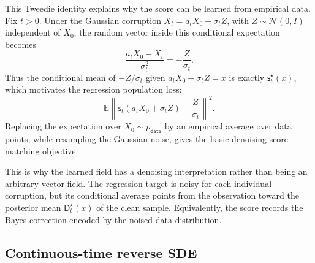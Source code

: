 \documentclass{amsart}
\numberwithin{equation}{section}
\theoremstyle{plain}
\theoremstyle{definition}
\theoremstyle{remark}
\newcommand{\E}{\mathbb{E}}
\newcommand{\Id}{I}
\newcommand{\norm}[1]{\left\lVert #1 \right\rVert}
\newcommand{\pdata}{p_{\mathsf{data}}}
\newcommand{\sstar}{\mathsf{s}^{\star}}
\newcommand{\score}{\mathsf{s}}
\newcommand{\dstar}{\mathsf{D}^{\star}}
\newcommand{\normal}[2]{\mathcal{N}\!\left(#1,#2\right)}
\begin{document}
This Tweedie identity explains why the score can be learned from empirical data.
Fix $t>0$.
Under the Gaussian corruption $X_t=a_tX_0+\sigma_t Z$, with
$Z\sim\normal{0}{\Id}$ independent of $X_0$, the random vector inside this
conditional expectation becomes
\[
    \frac{a_tX_0-X_t}{\sigma_t^2}
    =
    -\frac{Z}{\sigma_t}.
\]
Thus the conditional mean of $-Z/\sigma_t$ given $a_tX_0+\sigma_t Z=x$ is
exactly $\sstar_t(x)$, which motivates the regression population loss:
\[
    \E\norm{
        \score_t(a_tX_0+\sigma_t Z)+\frac{Z}{\sigma_t}
    }^2.
\]
Replacing the expectation over
$X_0\sim\pdata$ by an empirical average over data points, while resampling the
Gaussian noise, gives the basic denoising score-matching objective.

This is why the learned field has a denoising interpretation rather than being
an arbitrary vector field.  The regression target is noisy for each individual
corruption, but its conditional average points from the observation toward the
posterior mean $\dstar_t(x)$ of the clean sample.  Equivalently, the score
records the Bayes correction encoded by the noised data distribution.



\subsection{Continuous-time reverse SDE}
\end{document}
